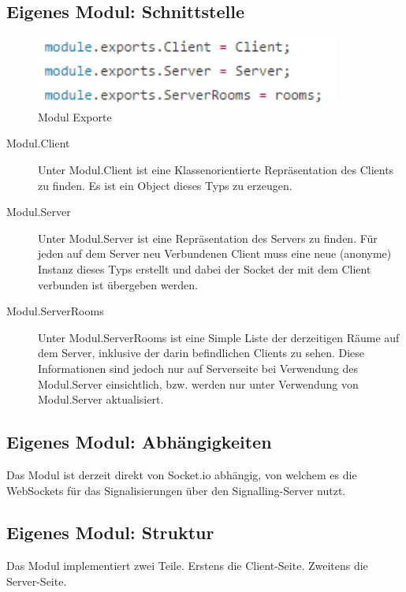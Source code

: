 \subsection{Eigenes Modul: Schnittstelle}
\begin{figure}[ht]
\centering
\includegraphics[width=0.9\textwidth]{backend/ModulExports.PNG}
\caption{Modul Exporte}
\label{backfig2}
\end{figure}

\begin{description}
\item[Modul.Client]
Unter Modul.Client ist eine Klassenorientierte Repräsentation des Clients zu 
finden. Es ist ein Object dieses Typs zu erzeugen.

\item[Modul.Server]
Unter Modul.Server ist eine Repräsentation des Servers zu finden. Für jeden auf 
dem Server neu Verbundenen Client muss eine neue (anonyme) Instanz dieses Typs 
erstellt und dabei der Socket der mit dem Client verbunden ist übergeben werden.

\item[Modul.ServerRooms]
Unter Modul.ServerRooms ist eine Simple Liste der derzeitigen Räume auf dem 
Server, inklusive der darin befindlichen Clients zu sehen. Diese Informationen 
sind jedoch nur auf Serverseite bei Verwendung des Modul.Server einsichtlich, 
bzw. werden nur unter Verwendung von Modul.Server aktualisiert.
\end{description}



\subsection{Eigenes Modul: Abhängigkeiten}
Das Modul ist derzeit direkt von Socket.io abhängig, von welchem es die 
WebSockets für das Signalisierungen über den Signalling-Server nutzt.



\subsection{Eigenes Modul: Struktur}
Das Modul implementiert zwei Teile. Erstens die Client-Seite. Zweitens die 
Server-Seite.



